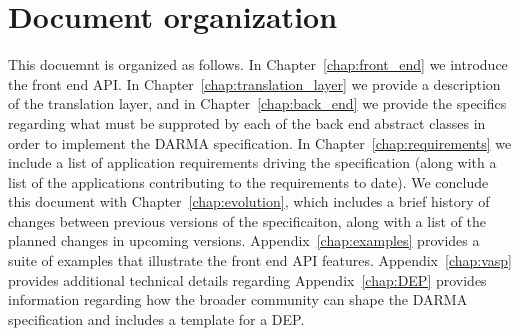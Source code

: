 






\section{Document organization}
\label{sec:organization}
This docuemnt is organized as follows.  In Chapter~\ref{chap:front_end} we
introduce the \gls{front end} \gls{API}.  In
Chapter~\ref{chap:translation_layer} we
provide a description of the \gls{translation layer}, and in
Chapter~\ref{chap:back_end} we provide the specifics regarding what must be
supproted by each of the \gls{back end} abstract classes in order to implement
the DARMA specification. In Chapter~\ref{chap:requirements} we include a list
of application requirements driving the specification (along with a list of the
    applications contributing to the requirements to date).
We conclude this document with
Chapter~\ref{chap:evolution}, which includes a brief history of changes between
previous versions of the specificaiton, along with a list of the planned changes 
in upcoming versions.
Appendix~\ref{chap:examples} provides a suite of examples that illustrate the
 \gls{front end} \gls{API} features. Appendix~\ref{chap:vasp} provides
additional technical details regarding %
Appendix~\ref{chap:DEP} provides information regarding how the broader
community can shape the \gls{DARMA} specification and includes a template for 
a \gls{DEP}. 

